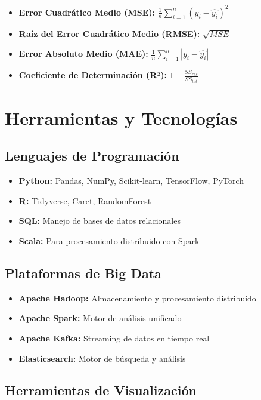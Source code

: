 \begin{itemize}
    \item \textbf{Error Cuadrático Medio (MSE):} $\frac{1}{n}\sum_{i=1}^{n}(y_i - \hat{y_i})^2$
    \item \textbf{Raíz del Error Cuadrático Medio (RMSE):} $\sqrt{MSE}$
    \item \textbf{Error Absoluto Medio (MAE):} $\frac{1}{n}\sum_{i=1}^{n}|y_i - \hat{y_i}|$
    \item \textbf{Coeficiente de Determinación (R²):} $1 - \frac{SS_{res}}{SS_{tot}}$
\end{itemize}

\section{Herramientas y Tecnologías}

\subsection{Lenguajes de Programación}

\begin{itemize}
    \item \textbf{Python:} Pandas, NumPy, Scikit-learn, TensorFlow, PyTorch
    \item \textbf{R:} Tidyverse, Caret, RandomForest
    \item \textbf{SQL:} Manejo de bases de datos relacionales
    \item \textbf{Scala:} Para procesamiento distribuido con Spark
\end{itemize}

\subsection{Plataformas de Big Data}

\begin{itemize}
    \item \textbf{Apache Hadoop:} Almacenamiento y procesamiento distribuido
    \item \textbf{Apache Spark:} Motor de análisis unificado
    \item \textbf{Apache Kafka:} Streaming de datos en tiempo real
    \item \textbf{Elasticsearch:} Motor de búsqueda y análisis
\end{itemize}

\subsection{Herramientas de Visualización}

